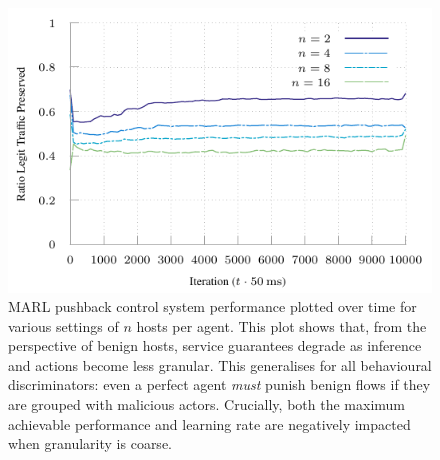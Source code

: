 \documentclass[conference, a4paper, 10pt, times]{IEEEtran}
\begin{document}
\begin{figure}
	\centering
	\includegraphics[width=0.90\linewidth]{../plots/online-varyN-binary}
	\caption{
		MARL pushback control system performance plotted over time for various settings of $n$ hosts per agent.
		This plot shows that, from the perspective of benign hosts, service guarantees degrade as inference and actions become less granular.
		This generalises for all behavioural discriminators: even a perfect agent \emph{must} punish benign flows if they are grouped with malicious actors.
		Crucially, both the maximum achievable performance and learning rate are negatively impacted when granularity is coarse.
		\label{fig:marl-granularity}
	}
\end{figure}
\end{document}
